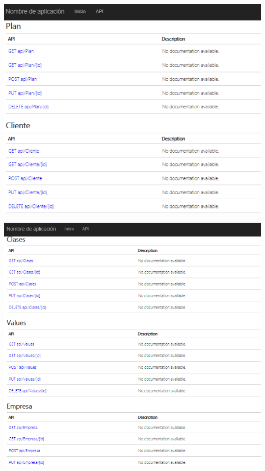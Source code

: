         \begin{center}
			\includegraphics[width=15cm]{./Imagenes/3}
             \end{center}
        \begin{center}
			\includegraphics[width=15cm]{./Imagenes/4}
             \end{center}
